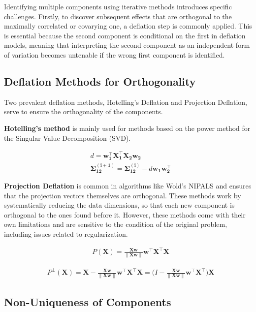 Identifying multiple components using iterative methods introduces specific challenges.
Firstly, to discover subsequent effects that are orthogonal to the maximally correlated or covarying one, a deflation step is commonly applied.
This is essential because the second component is conditional on the first in deflation models, meaning that interpreting the second component as an independent form of variation becomes untenable if the wrong first component is identified.

\subsection{Deflation Methods for Orthogonality}

Two prevalent deflation methods, Hotelling's Deflation and Projection Deflation, serve to ensure the orthogonality of the components.

\textbf{Hotelling's method}  is mainly used for methods based on the power method for the Singular Value
Decomposition (SVD).

\begin{align}
     & d = \mathbf{w^{\top}_1X^{\top}_1X_2w_2}                                            \\
     & \mathbf{\Sigma^{(i+1)}_{12}}= \mathbf{\Sigma^{(i)}_{12}} - d\mathbf{w_1w^{\top}_2}
\end{align}

\textbf{Projection Deflation} is common in algorithms like Wold's NIPALS and ensures that the projection vectors
themselves are orthogonal. These methods work by systematically reducing the data dimensions, so that each new component is orthogonal to the ones found before it. However, these methods come with their own limitations and are sensitive to the condition of the original problem, including issues related to regularization.

\begin{align}
     & P(\mathbf{X})= \frac{\mathbf{Xw}}{\|\mathbf{Xw}\|}\mathbf{w^{\top}X^{\top}X}
\end{align}

\begin{align}
     & P^\perp(\mathbf{X})= \mathbf{X} - \frac{\mathbf{Xw}}{\|\mathbf{Xw}\|}\mathbf{w^{\top}X^{\top}X} = (I - \frac{\mathbf{Xw}}{\|\mathbf{Xw}\|}\mathbf{w^{\top}X^{\top})X}
\end{align}

\subsection{Non-Uniqueness of Components}

